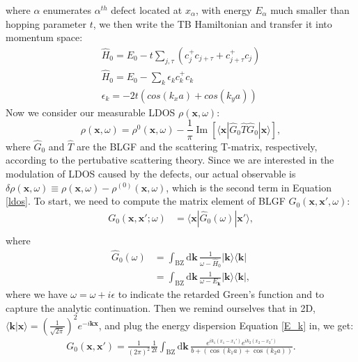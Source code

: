 where $\alpha$ enumerates $\alpha^{th}$ defect located at $x_\alpha$, with energy $E_{\alpha}$ much smaller than hopping parameter $t$, we then write the \ac{TB} Hamiltonian and transfer it into momentum space:
\begin{align}
\hat{H}_0 = E_0 -t \sum_{j,\tau} (c_j^{+} c_{j+\tau} + c_{j+\tau}^{+} c_j) \label{h0_real} \\
\hat{H}_0 = E_0 -\sum_{k} \epsilon_k c_k^{+} c_k \label{h0_k} \\
\epsilon_k = -2t(cos(k_x a)+cos(k_y a)) \label{E_k}
\end{align}
Now we consider our measurable \ac{LDOS} $\rho(\mathbf{x},\omega)$:
\begin{equation}
\rho(\mathbf{x},\omega) = \rho^{0}(\mathbf{x},\omega) - \frac{1}{\pi} \operatorname{Im} \left[ \langle \mathbf{x} | \hat{G}_0 \hat{T} \hat{G}_0 |\mathbf{x} \rangle \right],
\label{ldos}
\end{equation}
where $\hat{G}_0$ and $\hat{T}$ are the \ac{BLGF} and the scattering T-matrix, respectively, according to the pertubative scattering theory. Since we are interested in the modulation of \ac{LDOS} caused by the defects, our actual observable is $\delta \rho(\mathbf{x}, \omega) \equiv \rho(\mathbf{x}, \omega) - \rho^{(0)}(\mathbf{x}, \omega)
$, which is the second term in Equation \ref{ldos}.
To start, we need to compute the matrix element of \ac{BLGF} $G_0(\mathbf{x},\mathbf{x'},\omega)$:
\begin{align}
	G_0(\mathbf{x},\mathbf{x}';\omega) &= \langle \mathbf{x} | \hat{G}_0(\omega) | \mathbf{x}' \rangle, \\
\end{align}
where
\begin{align}
	\hat{G}_0(\omega) &= \int_{\text{BZ}} \mathrm{d}\mathbf{k} \, \frac{1}{\omega - \hat{H}_0} \lvert \mathbf{k} \rangle \langle \mathbf{k} \rvert \nonumber \\ 
	&= \int_{\text{BZ}} \mathrm{d}\mathbf{k} \, \frac{1}{\omega - E_\mathbf{k}} \lvert \mathbf{k} \rangle \langle \mathbf{k} \rvert,
\end{align}
where we have $\omega= \omega + i\epsilon$ to indicate the retarded Green's function and to capture the analytic continuation. Then we remind ourselves that in 2D, $\langle \mathbf{k}|\mathbf{x} \rangle = (\frac{1}{\sqrt{2\pi}})^2 e^{-i\mathbf{k}\mathbf{x}}$, and plug the energy dispersion Equation \ref{E_k} in, we get: 
\begin{align}
	G_0(\mathbf{x}, \mathbf{x}') = 
	\frac{1}{(2\pi)^2} \frac{1}{2t} 
	\int_{\text{BZ}} \mathrm{d}\mathbf{k} \, 
	\frac{e^{i k_1 (x_1 - x_1')} e^{i k_2 (x_2 - x_2')}}{b + \left( \cos(k_1 a) + \cos(k_2 a) \right)}. 
\end{align}
